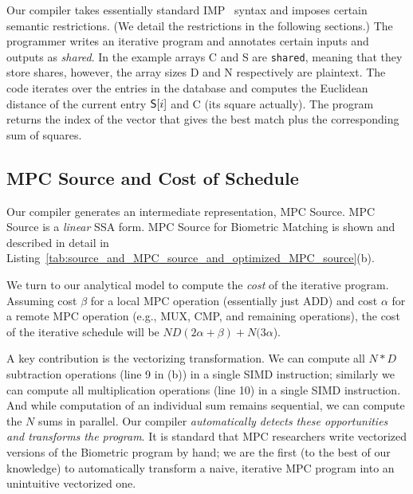 Our compiler takes essentially standard IMP~
syntax and imposes certain semantic restrictions. (We detail the restrictions in the following sections.)
The programmer writes an iterative program and annotates certain inputs
and outputs as \emph{shared}. In the example arrays {\sf C} and {\sf S}
are \texttt{shared}, meaning that they store shares, however, the array sizes {\sf D} and
{\sf N} respectively are plaintext. The code iterates over the entries in the
database and computes the Euclidean distance of the current
entry ${\sf S}[i]$ and {\sf C} (its square actually). The program returns the index of the vector that gives
the best match plus the corresponding sum of squares.

\subsection{MPC Source and Cost of Schedule}

Our compiler generates an intermediate representation, MPC Source. 
MPC Source is a \emph{linear} SSA form.
MPC Source for Biometric Matching is shown and described in detail in
Listing~\ref{tab:source_and_MPC_source_and_optimized_MPC_source}(b). 


\begin{comment}
First, MPC Source is an SSA form.
Second, it is linear. The conditional in lines 13-14 in IMP Source turns into the linear code in lines 12-16 in MPC Source.
The test turns into the CMP operation {\sf t = CMP(sum!3,min\_sum!2)}, followed by the
true-branch sequence, followed by the MUX operations. The first MUX operation selects the value
of {\sf min\_sum}: if {\sf t} is true, then {\sf min\_sum} gets the value of the second multiplexer
argument,  {\sf min\_sum!3}, otherwise it takes the value of the third argument, {\sf min\_sum!2}.
Third, MPC Source is a special form of SSA. The SSA $\phi$-nodes at the if-then-else (lines 13-15) turn into
MUX operations, while the $\phi$-nodes at for-loops turn into \emph{pseudo} PHI nodes with a straightforward semantics.
\end{comment}

We turn to our analytical model to compute the \emph{cost} of the iterative program. Assuming
cost $\beta$ for a local MPC operation (essentially just ADD) and cost $\alpha$ for a remote
MPC operation (e.g., MUX, CMP, and remaining operations), the cost of the iterative schedule
will be $ND(2\alpha+\beta) + N(3\alpha$).

A key contribution is the vectorizing transformation. We can compute all $N*D$
subtraction operations (line 9 in (b)) in a single SIMD instruction; similarly we can compute
all multiplication operations (line 10) in a single SIMD instruction. And while computation
of an individual sum remains sequential, we can compute the $N$ sums in parallel.
Our compiler \emph{automatically detects these opportunities and transforms the program}.
It is standard that MPC researchers write vectorized versions of the Biometric
program by hand; we are the first (to the best of our knowledge) to automatically
transform a naive, iterative MPC program into an unintuitive vectorized one.

